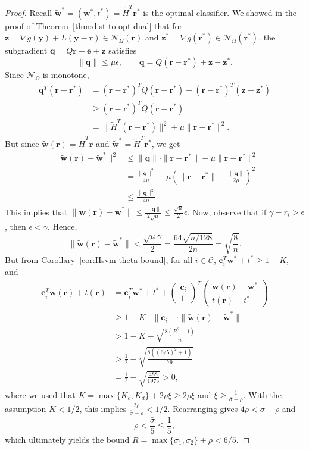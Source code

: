 \documentclass[twoside,11pt]{article}
\renewcommand{\c}{\bm{c}}
\newcommand\q{\bm{q}}
\renewcommand\r{\bm{r}}
\newcommand\w{\bm{w}}
\newcommand\y{\bm{y}}
\newcommand\z{\bm{z}}
\newcommand\e{\bm{e}}
\newcommand\CC{\mathcal{C}}
\newcommand\mN{\mathcal{N}}
\newcommand\tw{\tilde{\w}}
\newcommand\tc{\tilde{\c}}
\newcommand\tH{\tilde{H}}
\begin{document}
    \begin{proof}
        Recall $\tw^* = (\w^*, t^*) = \tH^T\r^*$ is the optimal classifier. We showed in the proof of Theorem~\ref{thm:dist-to-opt-dual} that for $\z = \nabla g(\y) + L(\y - \r) \in \mN_{\Omega}(\r)$ and $\z^* = \nabla g(\r^*) \in \mN_{\Omega}(\r^*)$, the subgradient $\q = Q\r - \e + \z$ satisfies
        \[
            \|\q\| \leq \mu\epsilon,\qquad \q = Q(\r - \r^*) + \z - \z^*.
        \]
        Since $\mN_{\Omega}$ is monotone,
        \begin{align*}
            \q^T(\r - \r^*) &= (\r - \r^*)^TQ(\r - \r^*) + (\r - \r^*)^T(\z - \z^*)\\
                            &\geq (\r - \r^*)^TQ(\r - \r^*)\\
                            &= \|\tH^T(\r - \r^*)\|^2 + \mu\|\r - \r^*\|^2.
        \end{align*}
        But since $\tw(\r) = \tH^T\r$ and $\tw^* = \tH^T\r^*$, we get
        \begin{align*}
            \|\tw(\r) - \tw^*\|^2 &\leq \|\q\|\cdot \|\r - \r^*\| - \mu\|\r - \r^*\|^2\\
                              &= \frac{\|\q\|^2}{4\mu} - \mu\left(\|\r - \r^*\| - \frac{\|\q\|}{2\mu}\right)^2\\
                              &\leq \frac{\|\q\|^2}{4\mu}.
        \end{align*}
        This implies that $\|\tw(\r) - \tw^*\| \leq \frac{\|\q\|}{2\sqrt{\mu}} \leq \frac{\sqrt{\mu}}{2}\epsilon$. Now, observe that if $\gamma - r_i > \epsilon$, then $\epsilon < \gamma$. Hence,
        \[
            \|\tw(\r) - \tw^*\| < \frac{\sqrt{\mu}\gamma}{2} = \frac{64\sqrt{n/128}}{2n} = \sqrt{\frac{8}{n}}.
        \]
        But from Corollary~\ref{cor:Hsvm-theta-bound}, for all $i \in \CC$, $\c_i^T\w^* + t^* \geq 1 - K$, and
        \begin{align*}
            \c_i^T\w(\r) + t(\r) &= \c_i^T\w^* + t^* + \begin{pmatrix}\c_i\\ 1\end{pmatrix}^T\begin{pmatrix}
                \w(\r) - \w^*\\
                t(\r) - t^*
            \end{pmatrix}\\
            &\geq 1 - K - \|\tc_i\|\cdot \|\tw(\r) - \tw^*\|\\
            &> 1 - K - \sqrt{\frac{8(R^2 + 1)}{n}}\\
            &> \frac{1}{2} - \sqrt{\frac{8((6/5)^2 + 1)}{79}}\\
            &= \frac{1}{2} - \sqrt{\frac{488}{1975}} > 0,
        \end{align*}
        where we used that $K = \max\{K_c, K_d\} + 2\rho\xi \geq 2\rho\xi$ and $\xi \geq \frac{1}{\bar{\sigma} - \rho}$. With the assumption $K < 1/2$, this implies $\frac{2\rho}{\bar{\sigma} - \rho} < 1/2$. Rearranging gives $4\rho < \bar{\sigma} - \rho$ and
        \[
            \rho < \frac{\bar{\sigma}}{5} \leq \frac{1}{5},
        \]
        which ultimately yields the bound $R = \max\{\sigma_1,\sigma_2\} + \rho < 6/5$.


\end{proof}
\end{document}
